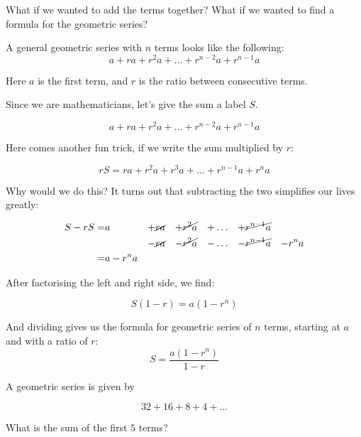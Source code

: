 What if we wanted to add the terms together? What if we wanted to find a formula for the geometric series? 

A general geometric series with $n$ terms looks like the following:
\[ a + ra + r^2a + \dots + r^{n-2}a + r^{n-1}a\]

Here $a$ is the first term, and $r$ is the ratio between consecutive terms.

Since we are mathematicians, let's give the sum a label $S$.

\[  a + ra + r^2a + \dots + r^{n-2}a + r^{n-1}a\]

Here comes another fun trick, if we write the sum multiplied by $r$:


\[ rS =  ra + r^2a + r^3a + \dots + r^{n-1}a + r^na\]

Why would we do this? It turns out that subtracting the two simplifies our lives greatly:

\begin{align*}
    S - rS =& a &+& \cancel{ra} &+& \cancel{r^2a} &+& \dots  &+& \cancel{r^{n-1}a} & &\\
        & &-&\cancel{ra} &-& \cancel{r^2a}  &-& \dots &-& \cancel{r^{n-1}a} &-& r^na\\
        =& a - r^na
\end{align*}

After factorising the left and right side, we find:

\[S(1-r) = a(1 - r^{n})\]

And dividing gives us the formula for geometric series of $n$ terms, starting at $a$ and with a ratio of $r$:
\[S = \frac{a(1 - r^{n})}{1-r}\]

\begin{example}
    A geometric series is given by

    \[ 32 + 16+ 8 + 4 + \dots\]

    What is the sum of the first $5$ terms?
\end{example}

